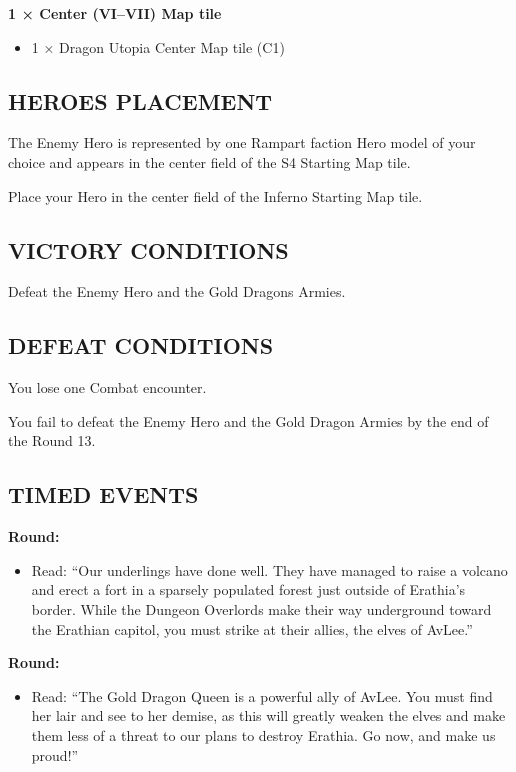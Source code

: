 \begin{multicols*}{2}
\textbf{1 × Center (VI--VII) Map tile}
\begin{itemize}
  \item 1 × Dragon Utopia Center Map tile (C1)
\end{itemize}

\subsection*{\MakeUppercase{Heroes placement}}

The Enemy Hero is represented by one Rampart faction Hero model of your choice
and appears in the center field of the S4 Starting Map tile.

Place your Hero in the center field of the Inferno Starting Map tile.

\subsection*{\MakeUppercase{Victory Conditions}}

Defeat the Enemy Hero and the Gold Dragons Armies.

\subsection*{\MakeUppercase{Defeat Conditions}}

You lose one Combat encounter.

You fail to defeat the Enemy Hero and the Gold Dragon Armies by the end of the Round 13.

\subsection*{\MakeUppercase{Timed Events}}

\textbf{ Round:}
\begin{itemize}
  \item Read: ``Our underlings have done well. They have managed to raise a volcano
    and erect a fort in a sparsely populated forest just outside of Erathia's border.
    While the Dungeon Overlords make their way underground toward the Erathian capitol,
    you must strike at their allies, the elves of AvLee.''
\end{itemize}

\textbf{ Round:}
\begin{itemize}
  \item Read: ``The Gold Dragon Queen is a powerful ally of AvLee.
    You must find her lair and see to her demise, as this will greatly weaken
    the elves and make them less of a threat to our plans to destroy Erathia.
    Go now, and make us proud!''
\end{itemize}


\end{multicols*}
